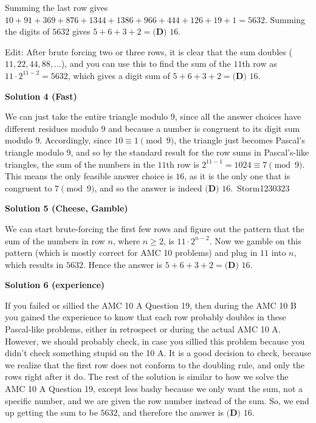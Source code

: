 \begin{enumerate}
 Summing the last row gives $10+91+369+876+1344+1386+966+444+126+19+1 = 5632$. Summing the digits of $5632$ gives $5+6+3+2 = \boxed{\textbf{(D) } 16}$.

 Edit: After brute forcing two or three rows, it is clear that the sum doubles ($11, 22, 44, 88, \dotsc$), and you can use this to find the sum of the $11$th row as $11 \cdot 2^{11-2} = 5632$, which gives a digit sum of $5+6+3+2 = \boxed{\textbf{(D) } 16}$.

 



\textbf{Solution 4 (Fast)}

We can just take the entire triangle modulo $9$, since all the answer choices have different residues modulo $9$ and because a number is congruent to its digit sum modulo $9$. Accordingly, since $10 \equiv 1 \pmod{9}$, the triangle just becomes Pascal's triangle modulo $9$, and so by the standard result for the row sums in Pascal's-like triangles, the sum of the numbers in the $11$th row is $2^{11-1} = 1024 \equiv 7 \pmod{9}$. This means the only feasible answer choice is $16$, as it is the only one that is congruent to $7 \pmod{9}$, and so the answer is indeed $\boxed{\textbf{(D) } 16}$.~Storm1230323

 



\textbf{Solution 5 (Cheese, Gamble)}

We can start brute-forcing the first few rows and figure out the pattern that the sum of the numbers in row $n$, where $n \geq 2$, is $11 \cdot 2^{n-2}$. Now we gamble on this pattern (which is mostly correct for AMC 10 problems) and plug in $11$ into $n$, which results in $5632$. Hence the answer is $5 + 6 + 3 + 2 = \boxed{\textbf{(D) } 16}$.

 



\textbf{Solution 6 (experience)}

If you failed or sillied the AMC 10 A Question 19, then during the AMC 10 B you gained the experience to know that each row probably doubles in these Pascal-like problems, either in retrospect or during the actual AMC 10 A. However, we should probably check, in case you sillied this problem because you didn't check something stupid on the 10 A. It is a good decision to check, because we realize that the first row does not conform to the doubling rule, and only the rows right after it do. The rest of the solution is similar to how we solve the AMC 10 A Question 19, except less bashy because we only want the sum, not a specific number, and we are given the row number instead of the sum. So, we end up getting the sum to be $5632$, and therefore the answer is $\boxed{\textbf{(D) } 16}$.


\end{enumerate}

